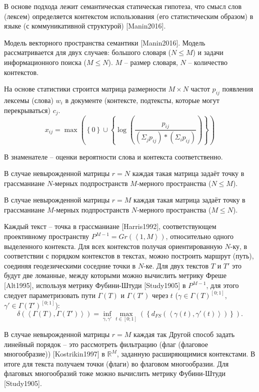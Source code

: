В основе подхода лежит семантическая статическая гипотеза, что смысл слов (лексем) определяется контекстом использования (его статистическим образом) в языке (с коммуникативной структурой) [Manin2016].

Модель векторного пространства семантики [Manin2016]. Модель рассматривается для двух случаев: большого словаря ($N\leq{M}$) и задачи информационного поиска ($M\leq{N}$). $M$ -- размер словаря, $N$ -- количество контекстов.

На основе статистики строится матрица размерности $M\times{N}$ частот $p_{ij}$ появления лексемы (слова) $w_{i}$ в документе (контексте, подтексты, которые могут перекрываться) $c_{j}$.
$$
x_{ij}=\max{\left( \left\lbrace 0\right\rbrace \cup \left\lbrace \log{\left(\frac{p_{ij}}{\left( \Sigma_{j} p_{ij}\right) *\left( \Sigma_{i} p_{ij}\right) } \right) }\right\rbrace \right) }
$$

В знаменателе -- оценки вероятности слова и контекста соответственно.

В случае невырожденной матрицы $r=N$ каждая такая матрица задаёт точку в грассманиане $N$‑мерных подпространств $M$‑мерного пространства ($N\leq{M}$).

В случае невырожденной матрицы $r=M$ каждая такая матрица задаёт точку в грассманиане $M$‑мерных подпространств $N$‑мерного пространства ($M\leq{N}$).

Каждый текст -- точка в грассманиане [Harris1992], соответствующем проективному пространству $P^{M-1}=Gr\left( \left\langle1,M \right\rangle \right)$, относительно одного выделенного контекста. Для всех контекстов получая ориентированную $N$-ку, в соответствии с порядком контекстов в текстах, можно построить маршрут (путь), соединяя геодезическими соседние точки в $N$-ке. Для двух текстов $T$ и $T'$ это будут две ломанные, между которыми можно вычислить метрику Фреше [Alt1995], используя метрику Фубини-Штуди [Study1905] в $P^{M-1}$, для этого следует параметризовать пути $\Gamma\left( T \right)$ и $\Gamma\left( T' \right)$ через $t$ ($\gamma\in\Gamma\left( T \right)^{\left[ 0;1\right] }$,$\gamma' \in\Gamma\left( T'\right)^{\left[ 0;1\right] }$): 
$$
\delta\left( \left\langle \Gamma\left( T \right),\Gamma\left( T'\right)\right\rangle \right) =\inf_{\gamma,\gamma'}\max_{t\in\left[ 0;1\right] }\left(  \left\lbrace d_{FS}\left( \left\langle \gamma\left( t\right) ,\gamma'\left( t\right) \right\rangle \right) \right\rbrace \right).
$$

В случае невырожденной матрицы $r=M$ каждая так
Другой способ задать линейный порядок -- это рассмотреть фильтрацию (флаг (флаговое многообразие)) [Kostrikin1997] в $\mathbb{R}^{M}$, заданную расширяющимися контекстами. В итоге для текста получаем точки (флаги) во флаговом многообразии. Для флаговых многообразий тоже можно вычислить метрику Фубини-Штуди [Study1905].

